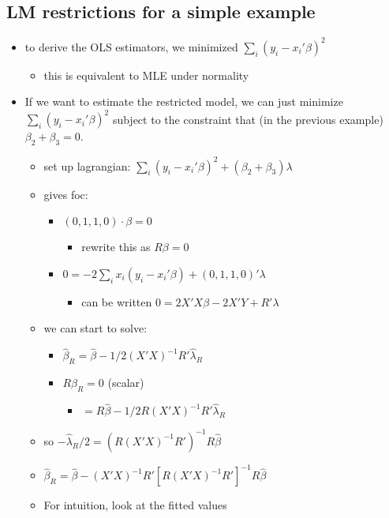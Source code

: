 \documentclass[11pt]{article}
\begin{document}
\subsection{LM restrictions for a simple example}
\label{sec-1-2}

\begin{itemize}
\item to derive the OLS estimators, we minimized $\sum_i (y_i -
      x_i'\beta)^2$
\begin{itemize}
\item this is equivalent to MLE under normality
\end{itemize}
\item If we want to estimate the restricted model, we can just minimize
      $\sum_i (y_i - x_i'\beta)^2$ subject to the constraint that (in
      the previous example) $\beta_2 + \beta_3 = 0$.
\begin{itemize}
\item set up lagrangian: $\sum_i (y_i - x_i'\beta)^2 + (\beta_2 + \beta_3)\lambda$
\item gives foc:
\begin{itemize}
\item $(0, 1, 1, 0) \cdot \beta = 0$
\begin{itemize}
\item rewrite this as $R\beta = 0$
\end{itemize}
\item $0 = - 2 \sum_i x_i (y_i - x_i'\beta) + (0, 1, 1, 0)' \lambda$
\begin{itemize}
\item can be written $0 = 2 X'X\beta - 2 X'Y + R' \lambda$
\end{itemize}
\end{itemize}
\item we can start to solve:
\begin{itemize}
\item $\hat\beta_R = \hat\beta - 1/2 (X'X)^{-1} R' \hat\lambda_R$
\item $R \hat\beta_R = 0$ (scalar)
\begin{itemize}
\item $= R \hat\beta - 1/2 R (X'X)^{-1} R' \hat\lambda_R$
\end{itemize}
\end{itemize}
\item so $- \hat\lambda_R/2 = (R (X'X)^{-1} R')^{-1} R\hat\beta$
\item $\hat\beta_R = \hat\beta - (X'X)^{-1} R' [R(X'X)^{-1}R']^{-1} R\hat\beta$
\item For intuition, look at the fitted values
\end{itemize}
\end{itemize}
\end{document}
